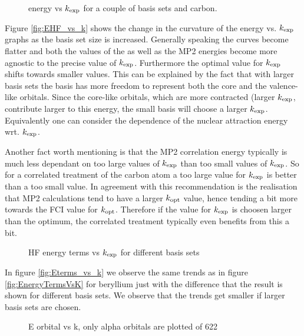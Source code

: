 \begin{figure}
	\centering
	\caption{\HF energy vs $k_\text{exp}$ for a couple of basis sets and carbon.}
	\label{fig:EHF_vs_k}
\end{figure}
Figure \vref{fig:EHF_vs_k} shows the change in the curvature
of the energy vs. $k_\text{exp}$ graphs as the basis set size is increased.
Generally speaking the curves become flatter and both the values of the
\HF as well as the MP2 energies become more agnostic to the precise value of $k_\text{exp}$.
Furthermore the optimal value for $k_\text{exp}$ shifts towards smaller values.
This can be explained by the fact that with larger basis sets
the basis has more freedom to represent both the core and the valence-like orbitals.
Since the core-like orbitals, which are more contracted (larger $k_\text{exp}$, contribute
larger to this energy, the small basis will choose a larger $k_\text{exp}$.
Equivalently one can consider the dependence of the nuclear attraction
energy wrt. $k_\text{exp}$.

Another fact worth mentioning is that the MP2 correlation energy typically
is much less dependant on too large values of $k_\text{exp}$ than too small values
of $k_\text{exp}$.
So for a correlated treatment of the carbon atom a too large value for $k_\text{exp}$
is better than a too small value.
In agreement with this recommendation is the realisation that
MP2 calculations tend to have a larger $k_\text{opt}$ value, hence tending a bit more
towards the FCI value for $k_\text{opt}$.
Therefore if the \HF value for $k_\text{exp}$ is choosen larger than the optimum,
the correlated treatment typically even benefits from this a bit.


\begin{figure}
	\centering
	\caption{HF energy terms vs $k_\text{exp}$ for different basis sets}
	\label{fig:Eterms_vs_k}
\end{figure}

In figure \vref{fig:Eterms_vs_k} we observe the same trends
as in figure \vref{fig:EnergyTermsVsK} for beryllium
just with the difference that
the result is shown for different basis sets.
We observe that the trends get smaller if larger basis sets are chosen.


\begin{figure}
	\centering
	\caption{E orbital vs k, only alpha orbitals are plotted of 622}
	\label{fig:orben_vs_k}
\end{figure}

